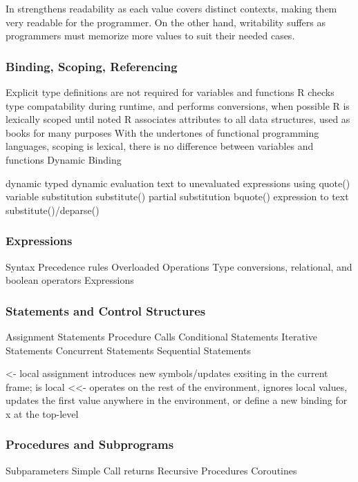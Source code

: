 \documentclass[12pt]{article}
\begin{document}
In strengthens readability as each value covers distinct contexts, making them very readable for the programmer. On the other hand, writability suffers as programmers must memorize more values to suit their needed cases.

\subsubsection{Binding, Scoping, Referencing}
  Explicit type definitions are not required for variables and functions
  R checks type compatability during runtime, and performs conversions, when possible
  R is lexically scoped until noted
  R associates attributes to all data structures, used as books for many purposes
  With the undertones of functional programming languages, scoping is lexical, there is no difference between variables and functions
  Dynamic Binding

  dynamic typed
  dynamic evaluation
  text to unevaluated expressions using quote()
  variable substitution substitute()
  partial substitution bquote()
  expression to text substitute()/deparse()

\subsubsection{Expressions}
Syntax
Precedence rules
Overloaded Operations
Type conversions, relational, and boolean operators
Expressions

\subsubsection{Statements and Control Structures}
Assignment Statements
Procedure Calls
Conditional Statements
Iterative Statements
Concurrent Statements
Sequential Statements

<- local assignment introduces new symbols/updates exsiting in the current frame; is local
<<- operates on the rest of the environment, ignores local values, updates the first value anywhere in the environment, or define a new binding for x at the top-level


\subsubsection{Procedures and Subprograms}
Subparameters
Simple Call returns
Recursive Procedures
Coroutines
\end{document}
